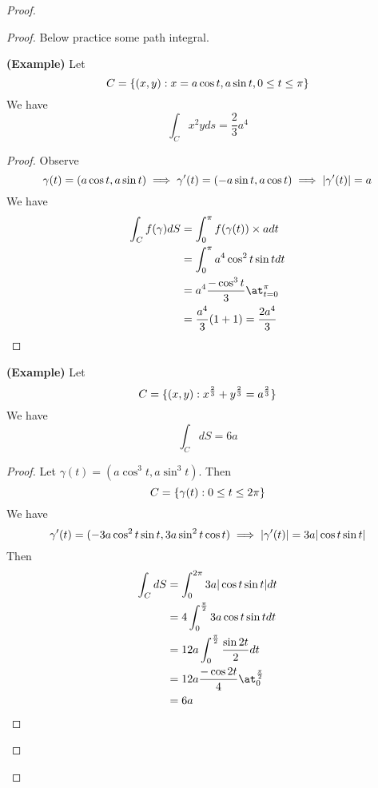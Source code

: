 \documentclass{report}
\begin{document}
\begin{proof}
\begin{proof}
{\begin{minipage}{39em}
Below practice some path integral.
\end{minipage}}
\begin{theorem}
\textbf{(Example)} Let
\begin{equation}
C=\{ (x,y):x=a\cos t,a\sin t, 0\leq t\leq \pi \}
\end{equation}
We have
\begin{equation}
\int_C x^2y ds=\frac{2}{3}a^4
\end{equation}
\end{theorem}
\begin{proof}
Observe
\begin{equation}
\gamma (t)=(a\cos t,a\sin t)\implies \gamma '(t)=(-a\sin t,a\cos t)\implies |\gamma '(t)|=a
\end{equation}
We have
\begin{align}
\int_C f(\gamma ) dS&=\int_0^{\pi} f(\gamma (t))\times adt\\
&=\int_0^{\pi} a^4 \cos^2t \sin tdt\\
&=a^4 \frac{-\cos^3 t}{3}\at_{t=0}^\pi\\
&=\frac{a^4}{3}(1+1)=\frac{2a^4}{3}
\end{align}
\end{proof}
\begin{theorem}
\textbf{(Example)} Let
\begin{equation}
  C=\{ (x,y):x^{\frac{2}{3}}+y^{\frac{2}{3}}=a ^{\frac{2}{3}} \}
\end{equation}
We have
\begin{equation}
\int_C dS= 6a
\end{equation}
\end{theorem}
\begin{proof}
Let $\gamma (t)=(a\cos^3 t,a\sin^3 t)$. Then 
\begin{equation}
C=\{ \gamma  (t):0\leq t\leq  2\pi  \}
\end{equation}
We have
\begin{equation}
\gamma '(t)=(-3a\cos ^2t \sin t,3a\sin^2 t\cos t)\implies |\gamma '(t)|=3a|\cos t\sin t|
\end{equation}
Then
\begin{align}
\int_C dS&= \int_0^{2\pi} 3a\abso{\cos t\sin t}dt\\
&=4\int_0^{\frac{\pi}{2}}3a \cos t \sin tdt\\
&=12a\int_0^{\frac{\pi}{2}}\frac{\sin 2t}{2}dt\\
&=12a \frac{-\cos 2t}{4}\at_{0}^{\frac{\pi}{2}}\\
&=6a

\end{align}
\end{proof}
\end{proof}
\end{proof}
\end{document}
